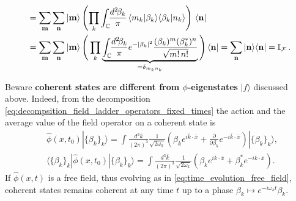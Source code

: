\documentclass[../QFT_main.tex]{subfiles}
\begin{document}
\begin{mytheorem}
\begin{align}
    &= \sum_{\mathbf{m}} \sum_{\mathbf{n}} |\mathbf{m}\rangle \left(\prod_k \int_{\mathbb{C}}\!\!\frac{d^2\!\beta_k}{\pi}\, \langle m_k | \beta_k \rangle \langle \beta_k | n_k \rangle\right) \,\langle \mathbf{n}|
    \\
    &= \sum_{\mathbf{m}} \sum_{\mathbf{n}} |\mathbf{m}\rangle\,\Bigg(\prod_k \underbrace{\int_{\mathbb{C}}\!\!\frac{d^2\!\beta_k}{\pi} e^{-|\beta_k|^2} \frac{(\beta_k)^m(\beta_k^*)^n}{\sqrt{m!\,n!}}}_{=\delta_{m_kn_k}}\Bigg) \,\langle \mathbf{n}|
    = \sum_{\mathbf{n}} |\mathbf{n}\rangle \langle \mathbf{n}| = \mathbb{I}_{\mathcal{F}}\,.
\end{align}

Beware \textbf{coherent states are different from $\phi$-eigenstates} $|f\rangle$ discussed above.
Indeed, from the decomposition \eqref{eq:decompsition_field_ladder_operators_fixed_times} the action and the average value of the field operator on a coherent state is
\begin{align}
    &\hat{\phi}(x,t_0) |\{ \beta_k \}_k \rangle
    = \int \frac{d^3\bar{k}}{(2\pi)^3} \frac{1}{\sqrt{2\omega_k}} \left( \beta_k e^{i \bar{k}\cdot\bar{x}} + \frac{\partial}{\partial \beta_k} e^{- i \bar{k}\cdot\bar{x}} \right) |\{ \beta_k \}_k \rangle,\\[5pt]
    &\langle \{ \beta_k \}_k | \hat{\phi}(x,t_0) | \{ \beta_k \}_k \rangle
    = \int \frac{d^3\bar{k}}{(2\pi)^3} \frac{1}{\sqrt{2\omega_k}} \left( \beta_k e^{i \bar{k}\cdot\bar{x}} + \beta_k^* e^{- i \bar{k}\cdot\bar{x}} \right).
\end{align}
If $\hat{\phi}(x,t)$ is a free field, thus evolving as in \eqref{eq:time_evolution_free_field}, coherent states remains coherent at any time $t$ up to a phase $\beta_k\mapsto  e^{-i \omega_k t}\beta_k$.


\end{mytheorem}
\end{document}
